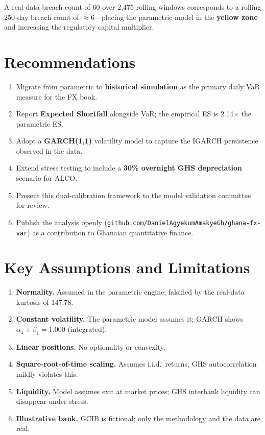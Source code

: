 \documentclass[11pt,a4paper]{article}
\newcommand{\reporef}{github.com/DanielAgyekumAmakyeGh/ghana-fx-var}
\begin{document}
\noindent A real-data breach count of 60 over 2{,}475 rolling windows
corresponds to a rolling 250-day breach count of \(\approx 6\)---placing
the parametric model in the \textbf{yellow zone} and increasing the
regulatory capital multiplier.

\section{Recommendations}

\begin{enumerate}[leftmargin=1.6em]
    \item Migrate from parametric to \textbf{historical simulation} as
          the primary daily VaR measure for the FX book.
    \item Report \textbf{Expected Shortfall} alongside VaR; the empirical
          ES is 2.14\(\times\) the parametric ES.
    \item Adopt a \textbf{GARCH(1,1)} volatility model to capture the
          IGARCH persistence observed in the data.
    \item Extend stress testing to include a \textbf{30\% overnight GHS
          depreciation} scenario for ALCO.
    \item Present this dual-calibration framework to the model validation
          committee for review.
    \item Publish the analysis openly (\texttt{\reporef}) as a
          contribution to Ghanaian quantitative finance.
\end{enumerate}

\section{Key Assumptions and Limitations}

\begin{enumerate}[leftmargin=1.6em]
    \item \textbf{Normality.} Assumed in the parametric engine; falsified
          by the real-data kurtosis of 147.78.
    \item \textbf{Constant volatility.} The parametric model assumes it;
          GARCH shows $\alpha_1 + \beta_1 = 1.000$ (integrated).
    \item \textbf{Linear positions.} No optionality or convexity.
    \item \textbf{Square-root-of-time scaling.} Assumes i.i.d.\ returns;
          GHS autocorrelation mildly violates this.
    \item \textbf{Liquidity.} Model assumes exit at market prices; GHS
          interbank liquidity can disappear under stress.
    \item \textbf{Illustrative bank.} GCIB is fictional; only the
          methodology and the data are real.
\end{enumerate}
\end{document}
